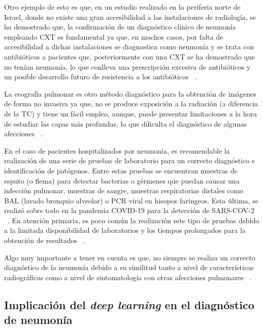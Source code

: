 Otro ejemplo de esto es que, en un estudio realizado en la periferia norte de Israel, donde no existe una gran accesibilidad a las instalaciones de radiología, se ha demostrado que, la confirmación de un diagnóstico clínico de neumonía empleando CXT es fundamental ya que, en muchos casos, por falta de  accesibilidad a dichas instalaciones se diagnostica como neumonía y se trata con antibióticos a pacientes que, posteriormente con una CXT se ha demostrado que no tenían neumonía, lo que conlleva una prescripción excesiva de antibióticos y un posible desarrollo futuro de resistencia a los antibióticos ~\cite{eilat2022community}.

La ecografía pulmonar es otro método diagnóstico para la obtención de imágenes de forma no invasiva ya que, no se produce exposición a la radiación (a diferencia de la TC) y tiene un fácil empleo, aunque, puede presentar limitaciones a la hora de estudiar las capas más profundas, lo que dificulta el diagnóstico de algunas afecciones ~\cite{antoni2021}.

En el caso de pacientes hospitalizados por neumonía, es recomendable la realización de una serie de pruebas de laboratorio para un correcto diagnóstico e identificación de patógenos. Entre estas pruebas se encuentran muestras de esputo (o flema) para detectar bacterias o gérmenes que puedan causar una infección pulmonar, muestras de sangre, muestras respiratorias distales como BAL (lavado bronquio alveolar) o PCR viral en hisopos faríngeos. Esta última, se realizó sobre todo en la pandemia COVID-19 para la detección de SARS-COV-2 ~\cite{antoni2021}. En atención primaria, es poco común la realización este tipo de pruebas debido a la limitada disponibilidad de laboratorios y los tiempos prolongados para la obtención de resultados ~\cite{lim2022pneumonia}.

Algo muy importante a tener en cuenta es que, no siempre se realiza un correcto diagnóstico de la neumonía debido a su similitud tanto a nivel de características radiográficas como a nivel de sintomatología con otras afecciones pulmonares ~\cite{lim2022pneumonia}.

\subsection{Implicación del \textit{deep learning} en el diagnóstico de neumonía}

